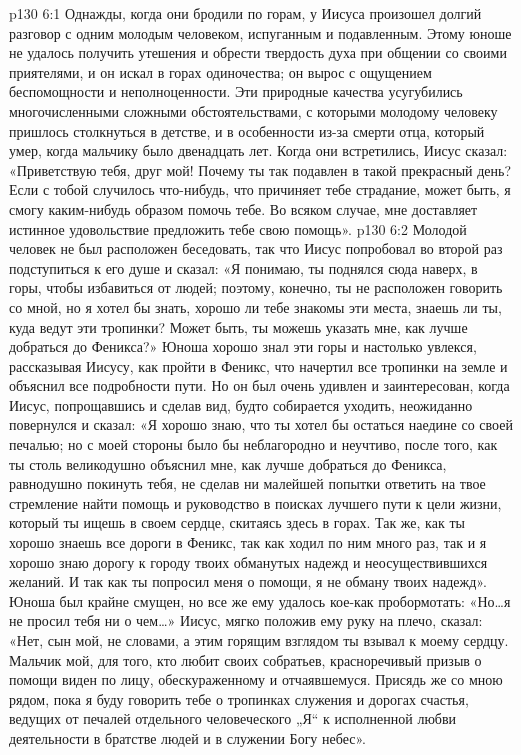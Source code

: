 \vs p130 6:1 Однажды, когда они бродили по горам, у Иисуса произошел долгий разговор с одним молодым человеком, испуганным и подавленным. Этому юноше не удалось получить утешения и обрести твердость духа при общении со своими приятелями, и он искал в горах одиночества; он вырос с ощущением беспомощности и неполноценности. Эти природные качества усугубились многочисленными сложными обстоятельствами, с которыми молодому человеку пришлось столкнуться в детстве, и в особенности из\hyp{}за смерти отца, который умер, когда мальчику было двенадцать лет. Когда они встретились, Иисус сказал: «Приветствую тебя, друг мой! Почему ты так подавлен в такой прекрасный день? Если с тобой случилось что\hyp{}нибудь, что причиняет тебе страдание, может быть, я смогу каким\hyp{}нибудь образом помочь тебе. Во всяком случае, мне доставляет истинное удовольствие предложить тебе свою помощь».
\vs p130 6:2 Молодой человек не был расположен беседовать, так что Иисус попробовал во второй раз подступиться к его душе и сказал: «Я понимаю, ты поднялся сюда наверх, в горы, чтобы избавиться от людей; поэтому, конечно, ты не расположен говорить со мной, но я хотел бы знать, хорошо ли тебе знакомы эти места, знаешь ли ты, куда ведут эти тропинки? Может быть, ты можешь указать мне, как лучше добраться до Феникса?» Юноша хорошо знал эти горы и настолько увлекся, рассказывая Иисусу, как пройти в Феникс, что начертил все тропинки на земле и объяснил все подробности пути. Но он был очень удивлен и заинтересован, когда Иисус, попрощавшись и сделав вид, будто собирается уходить, неожиданно повернулся и сказал: «Я хорошо знаю, что ты хотел бы остаться наедине со своей печалью; но с моей стороны было бы неблагородно и неучтиво, после того, как ты столь великодушно объяснил мне, как лучше добраться до Феникса, равнодушно покинуть тебя, не сделав ни малейшей попытки ответить на твое стремление найти помощь и руководство в поисках лучшего пути к цели жизни, который ты ищешь в своем сердце, скитаясь здесь в горах. Так же, как ты хорошо знаешь все дороги в Феникс, так как ходил по ним много раз, так и я хорошо знаю дорогу к городу твоих обманутых надежд и неосуществившихся желаний. И так как ты попросил меня о помощи, я не обману твоих надежд». Юноша был крайне смущен, но все же ему удалось кое\hyp{}как пробормотать: «Но\ldots я не просил тебя ни о чем\ldots » Иисус, мягко положив ему руку на плечо, сказал: «Нет, сын мой, не словами, а этим горящим взглядом ты взывал к моему сердцу. Мальчик мой, для того, кто любит своих собратьев, красноречивый призыв о помощи виден по лицу, обескураженному и отчаявшемуся. Присядь же со мною рядом, пока я буду говорить тебе о тропинках служения и дорогах счастья, ведущих от печалей отдельного человеческого „Я“ к исполненной любви деятельности в братстве людей и в служении Богу небес».

